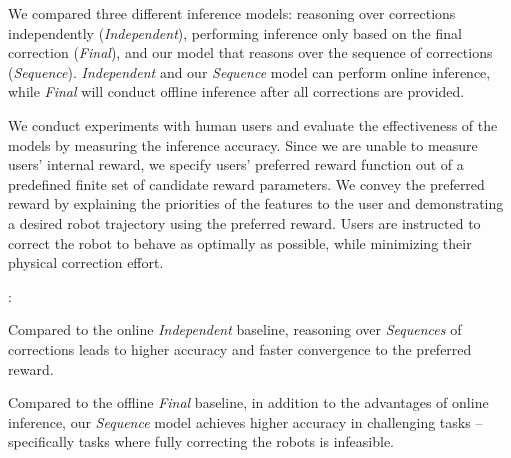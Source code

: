  We compared three different inference models: reasoning over corrections independently (\textit{Independent}), performing inference only based on the final correction (\textit{Final}), and our model that reasons over the sequence of corrections (\textit{Sequence}). \textit{Independent} and our \textit{Sequence} model can perform online inference, while \textit{Final} will conduct offline inference after all corrections are provided.


\smallskip
{}
We conduct experiments with human users and evaluate the effectiveness of the models by measuring the inference accuracy. Since we are unable to measure users' internal reward, we specify users' preferred reward function out of a predefined finite set of candidate reward parameters. We convey the preferred reward by explaining the priorities of the features to the user and demonstrating a desired robot trajectory using the preferred reward.
Users are instructed to correct the robot to behave as optimally as possible, while minimizing their physical correction effort. 
\smallskip

: 
\begin{hypothesis}
    Compared to the online \emph{Independent} baseline, reasoning over \emph{Sequences} of corrections leads to higher accuracy and faster convergence to the preferred reward.
\end{hypothesis}
\begin{hypothesis}
    Compared to the offline \emph{Final} baseline, in addition to the advantages of online inference, our \emph{Sequence} model achieves higher accuracy in challenging tasks -- specifically tasks where fully correcting the robots is infeasible.
\end{hypothesis}
\smallskip


